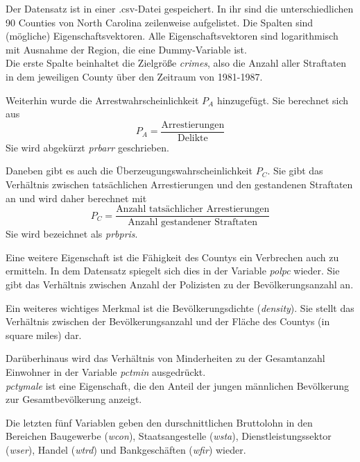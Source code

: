 Der Datensatz ist in einer .csv-Datei gespeichert.
In ihr sind die unterschiedlichen 90 Counties von North Carolina zeilenweise aufgelistet.
Die Spalten sind (m\"ogliche) Eigenschaftsvektoren.
Alle Eigenschaftsvektoren sind logarithmisch mit Ausnahme der Region, die eine Dummy-Variable ist. \\
Die erste Spalte beinhaltet die Zielgr\"o\ss{}e \textit{crimes}, also die Anzahl aller Straftaten in dem jeweiligen County \"uber den Zeitraum von 1981-1987. 
\par\smallskip
Weiterhin wurde die Arrestwahrscheinlichkeit $P_A$ hinzugef\"ugt. Sie berechnet sich aus 
\begin{equation}
P_A = \frac{\text{Arrestierungen}}{\text{Delikte}}
\end{equation}
Sie wird abgek\"urzt \textit{prbarr} geschrieben. \newline
\par\smallskip
Daneben gibt es auch die \"Uberzeugungswahrscheinlichkeit $P_C$. Sie gibt das Verh\"altnis zwischen tats\"achlichen Arrestierungen und den gestandenen Straftaten an und wird daher berechnet mit 
\begin{equation}
P_C = \frac{\text{Anzahl tats\"achlicher Arrestierungen}}{\text{Anzahl gestandener Straftaten}}
\end{equation}
Sie wird bezeichnet als \textit{prbpris}. \newline
\par\smallskip
Eine weitere Eigenschaft ist die F\"ahigkeit des Countys ein Verbrechen auch zu ermitteln. In dem Datensatz spiegelt sich dies in der Variable \textit{polpc} wieder. Sie gibt das Verh\"altnis zwischen Anzahl der Polizisten zu der Bev\"olkerungsanzahl an. \newline
\par\smallskip
Ein weiteres wichtiges Merkmal ist die Bev\"olkerungsdichte (\textit{density}). Sie stellt das Verh\"altnis zwischen der Bev\"olkerungsanzahl und der Fl\"ache des Countys (in square miles) dar. \newline
\par\smallskip
Dar\"uberhinaus wird das Verh\"altnis von Minderheiten zu der Gesamtanzahl Einwohner in der Variable \textit{pctmin} ausgedr\"uckt. \\
\textit{pctymale} ist eine Eigenschaft, die den Anteil der jungen m\"annlichen Bev\"olkerung zur Gesamtbev\"olkerung anzeigt. \\
\par\smallskip
Die letzten f\"unf Variablen geben den durschnittlichen Bruttolohn in den Bereichen Baugewerbe (\textit{wcon}), Staatsangestelle (\textit{wsta}), Dienstleistungssektor (\textit{wser}), Handel (\textit{wtrd}) und Bankgesch\"aften (\textit{wfir}) wieder.
\par\medskip

